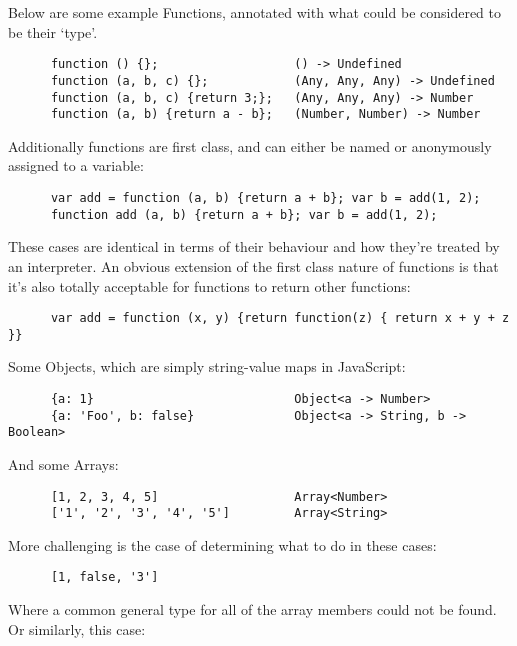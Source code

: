 \documentclass[british, twoside]{bhamthesis}
\theoremstyle{definition}
\begin{document}
    Below are some example Functions, annotated with what could be considered to be their `type'.

    \begin{lstlisting}
      function () {};                   () -> Undefined
      function (a, b, c) {};            (Any, Any, Any) -> Undefined
      function (a, b, c) {return 3;};   (Any, Any, Any) -> Number
      function (a, b) {return a - b};   (Number, Number) -> Number
    \end{lstlisting}

    Additionally functions are first class, and can either be named or anonymously assigned to a variable:

    \begin{lstlisting}
      var add = function (a, b) {return a + b}; var b = add(1, 2);
      function add (a, b) {return a + b}; var b = add(1, 2);
    \end{lstlisting}

    These cases are identical in terms of their behaviour and how they're treated by an interpreter. An obvious extension of the first class nature of functions is that it's also totally acceptable for functions to return other functions:

    \begin{lstlisting}
      var add = function (x, y) {return function(z) { return x + y + z }}
    \end{lstlisting}

    Some Objects, which are simply string-value maps in JavaScript:

    \begin{lstlisting}
      {a: 1}                            Object<a -> Number>
      {a: 'Foo', b: false}              Object<a -> String, b -> Boolean>
    \end{lstlisting}

    And some Arrays:

    \begin{lstlisting}
      [1, 2, 3, 4, 5]                   Array<Number>
      ['1', '2', '3', '4', '5']         Array<String>
    \end{lstlisting}

    More challenging is the case of determining what to do in these cases:

    \begin{lstlisting}
      [1, false, '3']
    \end{lstlisting}

    Where a common general type for all of the array members could not be found. Or similarly, this case:
\end{document}
